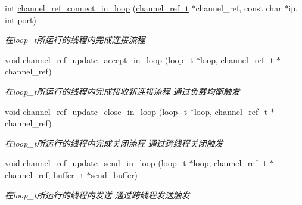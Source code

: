 \begin{DoxyCompactItemize}
int \hyperlink{a00045_a593567b0d669138e1c1103ac331da7a5_a593567b0d669138e1c1103ac331da7a5}{channel\+\_\+ref\+\_\+connect\+\_\+in\+\_\+loop} (\hyperlink{a00047_a151271c9d188ef28d4d24bb81dcc1263_a151271c9d188ef28d4d24bb81dcc1263}{channel\+\_\+ref\+\_\+t} $\ast$channel\+\_\+ref, const char $\ast$ip, int port)
\begin{DoxyCompactList}\small\item\em 在loop\+\_\+t所运行的线程内完成连接流程 \end{DoxyCompactList}\item 
void \hyperlink{a00045_af2b04a39619b524c176a1b921a2a662d_af2b04a39619b524c176a1b921a2a662d}{channel\+\_\+ref\+\_\+update\+\_\+accept\+\_\+in\+\_\+loop} (\hyperlink{a00047_a9c3ad1cd2de83e09f3a7b59fa82c94ee_a9c3ad1cd2de83e09f3a7b59fa82c94ee}{loop\+\_\+t} $\ast$loop, \hyperlink{a00047_a151271c9d188ef28d4d24bb81dcc1263_a151271c9d188ef28d4d24bb81dcc1263}{channel\+\_\+ref\+\_\+t} $\ast$channel\+\_\+ref)
\begin{DoxyCompactList}\small\item\em 在loop\+\_\+t所运行的线程内完成接收新连接流程 通过负载均衡触发 \end{DoxyCompactList}\item 
void \hyperlink{a00045_acd7537431cf488ed39e782e63f79d997_acd7537431cf488ed39e782e63f79d997}{channel\+\_\+ref\+\_\+update\+\_\+close\+\_\+in\+\_\+loop} (\hyperlink{a00047_a9c3ad1cd2de83e09f3a7b59fa82c94ee_a9c3ad1cd2de83e09f3a7b59fa82c94ee}{loop\+\_\+t} $\ast$loop, \hyperlink{a00047_a151271c9d188ef28d4d24bb81dcc1263_a151271c9d188ef28d4d24bb81dcc1263}{channel\+\_\+ref\+\_\+t} $\ast$channel\+\_\+ref)
\begin{DoxyCompactList}\small\item\em 在loop\+\_\+t所运行的线程内完成关闭流程 通过跨线程关闭触发 \end{DoxyCompactList}\item 
void \hyperlink{a00045_ab2afcbb2288d9654f7eb656a8c242167_ab2afcbb2288d9654f7eb656a8c242167}{channel\+\_\+ref\+\_\+update\+\_\+send\+\_\+in\+\_\+loop} (\hyperlink{a00047_a9c3ad1cd2de83e09f3a7b59fa82c94ee_a9c3ad1cd2de83e09f3a7b59fa82c94ee}{loop\+\_\+t} $\ast$loop, \hyperlink{a00047_a151271c9d188ef28d4d24bb81dcc1263_a151271c9d188ef28d4d24bb81dcc1263}{channel\+\_\+ref\+\_\+t} $\ast$channel\+\_\+ref, \hyperlink{a00047_aad99a77d28bd81d3d36d0ea569c9482d_aad99a77d28bd81d3d36d0ea569c9482d}{buffer\+\_\+t} $\ast$send\+\_\+buffer)
\begin{DoxyCompactList}\small\item\em 在loop\+\_\+t所运行的线程内发送 通过跨线程发送触发 \end{DoxyCompactList}\item 

\end{DoxyCompactItemize}
